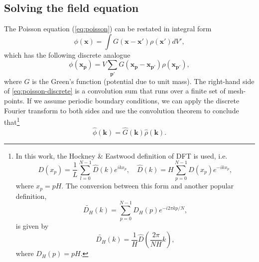 \subsection{Solving the field equation}
The Poisson equation (\autoref{eq:poisson}) can be restated in integral form
\begin{equation*}
    \phi(\mathbf{x}) = \int G(\mathbf{x}-\mathbf{x}')\rho(\mathbf{x}') dV',
\end{equation*}
which has the following discrete analogue
\begin{equation}\label{eq:poisson-discrete}
    \phi(\mathbf{x}_\mathbf{p}) = V \sum_{\mathbf{p}'} G(\mathbf{x}_\mathbf{p} - \mathbf{x}_{\mathbf{p}'}) \rho(\mathbf{x}_{\mathbf{p}'}),
\end{equation}
where $G$ is the Green's function (potential due to unit mass).
The right-hand side of \autoref{eq:poisson-discrete} is a convolution sum that runs over a finite set of mesh-points.
If we assume periodic boundary conditions, we can apply the discrete Fourier transform to both sides and use the convolution theorem to conclude that\footnote{
    In this work, the Hockney \& Eastwood definition of DFT is used, i.e.
    \begin{equation*}
        D(x_p) = \frac{1}{L}\sum_{l=0}^{N-1}\hat{D}(k)e^{ikx_p}, \quad \hat{D}(k) = H\sum_{p=0}^{N-1}D(x_p)e^{-ikx_p},
    \end{equation*}
    where $x_p = pH$.
    The conversion between this form and another popular definition,
    \begin{equation}\label{eq:standard-dft}
        \widetilde{D_H}(k) = \sum_{p=0}^{N-1}D_H(p)e^{-i2\pi kp / N},
    \end{equation}
    is given by
    \begin{equation*}
        \widetilde{D_H}(k) = \frac{1}{H}\hat{D}\left(\frac{2\pi}{NH}k\right),
    \end{equation*}
    where  $D_H(p) = pH$.
}
\begin{equation}\label{eq:poisson-fourier-product}
    \hat{\phi}(\mathbf{k}) = \hat{G}(\mathbf{k}) \hat{\rho}(\mathbf{k}).
\end{equation}

